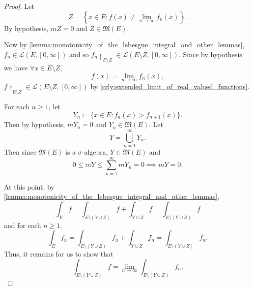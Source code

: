 \documentclass[notoc,notitlepage]{tufte-book}
\begin{document}
\begin{proof}
   Let
  \begin{equation*}
    Z = \left\{ x \in E : f(x) \neq \lim_{n \to \infty} f_n(x) \right\}.
  \end{equation*}
  By hypothesis, $mZ = 0$ and $Z \in \mathfrak{M}(E)$.

  Now by \cref{lemma:monotonicity_of_the_lebesgue_integral_and_other_lemmas}, $f_n \in
  \mathcal{L}(E, [0, \infty])$ and so $f_n \restriction_{E \setminus Z} \in
  \mathcal{L}(E \setminus Z, [0, \infty])$. Since by hypothesis we have $\forall
  x \in E \setminus Z$,
  \begin{equation*}
    f(x) = \lim_{n \to \infty} f_n(x),
  \end{equation*}
  $f \restriction_{E \setminus Z} \in \mathcal{L}(E \setminus Z, [0,
  \infty])$ by \cref{crly:extended_limit_of_real_valued_functions}.

  \noindent
   For each $n \geq 1$, let
  \begin{equation*}
    Y_n \coloneqq \{ x \in E : f_n(x) > f_{n+1}(x) \}.
  \end{equation*}
  Then by hypothesis, $mY_n = 0$ and $Y_n \in \mathfrak{M}(E)$. Let
  \begin{equation*}
    Y = \bigcup_{n=1}^{\infty} Y_n.
  \end{equation*}
  Then since $\mathfrak{M}(E)$ is a $\sigma$-algebra, $Y \in \mathfrak{M}(E)$
  and
  \begin{equation*}
    0 \leq mY \leq \sum_{n=1}^{\infty} mY_n = 0 \implies mY = 0.
  \end{equation*}

  At this point, by
  \cref{lemma:monotonicity_of_the_lebesgue_integral_and_other_lemmas},
  \begin{equation*}
    \int_{E} f = \int_{E \setminus (Y \cup Z)} f + \int_{Y \cup Z} f = \int_{E
    \setminus (Y \cup Z)} f
  \end{equation*}
  and for each $n \geq 1$,
  \begin{equation*}
    \int_{E} f_n = \int_{E \setminus (Y \cup Z)} f_n + \int_{Y \cup Z} f_n =
    \int_{E \setminus (Y \cup Z)} f_n.
  \end{equation*}
  Thus, it remains for us to show that
  \begin{equation*}
    \int_{E \setminus (Y \cup Z)} f = \lim_{n \to \infty} \int_{E \setminus (Y
    \cup Z)} f_n.
  \end{equation*}


\end{proof}
\end{document}
